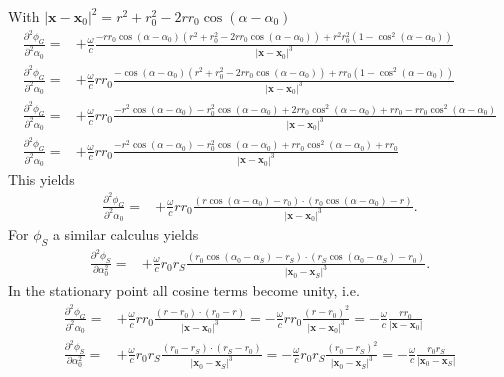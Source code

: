 \documentclass[a4paper,BCOR=15mm,10pt,twoside]{scrartcl}
\newcommand\wc{\frac{\omega}{c}}  %
\newcommand\azx{\alpha}  %
\renewcommand{\vec}[1]{\mathbf{#1}}  %
\begin{document}
%
With $|\vec{x} -\vec{x}_0|^2 = {r^2 + r_0^2 -2 r r_0 \cos(\azx-\azx_0)}$
%
\begin{align}
\frac{\partial^2 \phi_G}{\partial^2 \azx_0} =&+\wc \frac{
- r r_0 \cos(\azx-\azx_0) (r^2 + r_0^2 -2 r r_0 \cos(\azx-\azx_0)) + 
r^2 r_0^2 (1-\cos^2(\azx-\azx_0))
}
{|\vec{x} -\vec{x}_0|^3}\\
\frac{\partial^2 \phi_G}{\partial^2 \azx_0} =&+\wc r r_0 \frac{
- \cos(\azx-\azx_0) (r^2 + r_0^2 -2 r r_0 \cos(\azx-\azx_0)) + 
r r_0 (1-\cos^2(\azx-\azx_0))
}
{|\vec{x} -\vec{x}_0|^3}\\
\frac{\partial^2 \phi_G}{\partial^2 \azx_0} =&+\wc r r_0 \frac{
-r^2 \cos(\azx-\azx_0) - r_0^2 \cos(\azx-\azx_0) + 2 r r_0 \cos^2(\azx-\azx_0) + 
r r_0 - r r_0 \cos^2(\azx-\azx_0)
}
{|\vec{x} -\vec{x}_0|^3}\\
\frac{\partial^2 \phi_G}{\partial^2 \azx_0} =&+\wc r r_0 \frac{
-r^2 \cos(\azx-\azx_0) - r_0^2 \cos(\azx-\azx_0) + r r_0 \cos^2(\azx-\azx_0) + 
r r_0
}
{|\vec{x} -\vec{x}_0|^3}
\end{align}
This yields
\begin{align}
\frac{\partial^2 \phi_G}{\partial^2 \azx_0} =&+\wc r r_0 \frac{
(r \cos(\azx-\azx_0) - r_0) \cdot (r_0 \cos(\azx-\azx_0) - r)
}
{|\vec{x} -\vec{x}_0|^3}.
\end{align}
For $\phi_S$ a similar calculus yields
\begin{align}
\frac{\partial^2 \phi_S}{\partial \azx_0^2} =&+\wc r_0 r_S \frac{
(r_0 \cos(\azx_0-\azx_S) - r_S) \cdot (r_S \cos(\azx_0-\azx_S) - r_0)
}
{|\vec{x}_0 -\vec{x}_S|^3}.
\end{align}
In the stationary point all cosine terms become unity, i.e.
\begin{align}
\frac{\partial^2 \phi_G}{\partial^2 \azx_0} =&+\wc r r_0 \frac{
(r - r_0) \cdot (r_0 - r)
}
{|\vec{x} -\vec{x}_0|^3} = -\wc r r_0 \frac{
(r - r_0)^2 
}
{|\vec{x} -\vec{x}_0|^3}=
-\wc \frac{r r_0}{|\vec{x} -\vec{x}_0|}\\
%
\frac{\partial^2 \phi_S}{\partial \azx_0^2} =&+\wc r_0 r_S \frac{
(r_0 - r_S) \cdot (r_S - r_0)
}
{|\vec{x}_0 -\vec{x}_S|^3} = -\wc r_0 r_S \frac{
(r_0 - r_S)^2
}
{|\vec{x}_0 -\vec{x}_S|^3} = -\wc \frac{
r_0 r_S
}
{|\vec{x}_0 -\vec{x}_S|}
\end{align}
\end{document}
